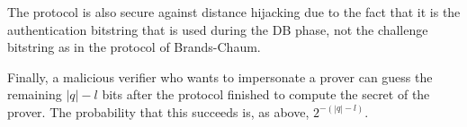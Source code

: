The protocol is also secure against distance hijacking due to the fact
that it is the authentication bitstring that is used during the \ac{DB}
phase, not the challenge bitstring as in the protocol of Brands-Chaum.

Finally, a malicious verifier who wants to impersonate a prover can guess the 
remaining \(|q|-l\) bits after the protocol finished to compute the secret of 
the prover.
The probability that this succeeds is, as above, \(2^{-(|q|-l)}\).
